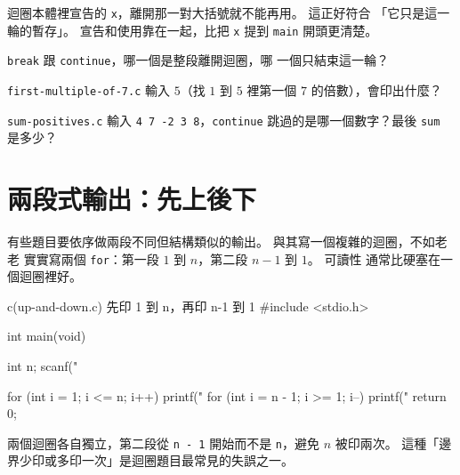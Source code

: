 迴圈本體裡宣告的 \texttt{x}，離開那一對大括號就不能再用。 這正好符合
「它只是這一輪的暫存」。 宣告和使用靠在一起，比把 \texttt{x} 提到
\texttt{main} 開頭更清楚。


\begin{drills}[label=drills:loop-break-continue]
\item \texttt{break} 跟 \texttt{continue}，哪一個是整段離開迴圈，哪
一個只結束這一輪？
\item \texttt{first-multiple-of-7.c} 輸入 $5$（找 $1$ 到 $5$ 裡第一個
$7$ 的倍數），會印出什麼？
\item \texttt{sum-positives.c} 輸入 \texttt{4 7 -2 3 8}，\texttt{continue}
跳過的是哪一個數字？最後 \texttt{sum} 是多少？
\end{drills}

\section{兩段式輸出：先上後下}
\label{sec:loop-two-stage}

有些題目要依序做兩段不同但結構類似的輸出。 與其寫一個複雜的迴圈，不如老老
實實寫兩個 \texttt{for}：第一段 $1$ 到 $n$，第二段 $n-1$ 到 $1$。 可讀性
通常比硬塞在一個迴圈裡好。

\begin{example}{c}{(up-and-down.c) 先印 1 到 n，再印 n-1 到 1}
#include <stdio.h>

int main(void) {
    int n;
    scanf("%

    for (int i = 1; i <= n; i++) {
        printf("%
    }
    for (int i = n - 1; i >= 1; i--) {
        printf("%
    }
    return 0;
}
\end{example}


兩個迴圈各自獨立，第二段從 \texttt{n - 1} 開始而不是 \texttt{n}，避免
$n$ 被印兩次。 這種「邊界少印或多印一次」是迴圈題目最常見的失誤之一。


